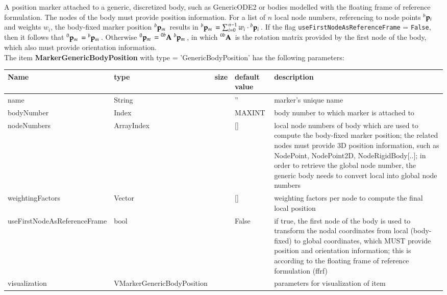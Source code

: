 A position marker attached to a generic, discretized body, such as GenericODE2 or bodies modelled with the floating frame of reference formulation. The nodes of the body must provide position information. For a list of $n$ local node numbers, referencing to node points $\prescript{b}{}{\mathbf{p}_i}\,$ and weights $w_i$, the body-fixed marker position $\prescript{b}{}{\mathbf{p}_m}\,$ results in $\prescript{b}{}{\mathbf{p}_m}\, = \sum_{i=0}^{n-1}w_i \cdot \prescript{b}{}{\mathbf{p}_i}\,$. If the flag \texttt{useFirstNodeAsReferenceFrame} = \texttt{False}, then it follows that $\prescript{0}{}{\mathbf{p}_m}\, = \prescript{b}{}{\mathbf{p}_m}\,$. Otherwise $\prescript{0}{}{\mathbf{p}_m}\, = \prescript{0b}{}{\mathbf{A}}\, \prescript{b}{}{\mathbf{p}_m}\,$, in which $\prescript{0b}{}{\mathbf{A}}\,$ is the rotation matrix provided by the first node of the body, which also must provide orientation information.
 \\\vspace{12pt} \noindent The item {\bf MarkerGenericBodyPosition} with type = 'GenericBodyPosition' has the following parameters:\vspace{-1cm}\\ 
\begin{center}
  \footnotesize
  \begin{longtable}{| p{4.5cm} | p{2.5cm} | p{0.5cm} | p{2.5cm} | p{6cm} |}
    \hline
    \bf Name & \bf type & \bf size & \bf default value & \bf description \\ \hline
    name &     String &      &     '' &     marker's unique name\\ \hline
    bodyNumber &     Index &      &     MAXINT &     body number to which marker is attached to\\ \hline
    nodeNumbers &     ArrayIndex &      &     [] &     local node numbers of body which are used to compute the body-fixed marker position; the related nodes must provide 3D position information, such as NodePoint, NodePoint2D, NodeRigidBody[..]; in order to retrieve the global node number, the generic body needs to convert local into global node numbers\\ \hline
    weightingFactors &     Vector &      &     [] &     weighting factors per node to compute the final local position\\ \hline
    useFirstNodeAsReferenceFrame &     bool &      &     False &     if true, the first node of the body is used to transform the nodal coordinates from local (body-fixed) to global coordinates, which MUST provide position and orientation information; this is according to the floating frame of reference formulation (ffrf)\\ \hline
    visualization & VMarkerGenericBodyPosition & & & parameters for visualization of item \\ \hline
	  \end{longtable}
	\end{center}

